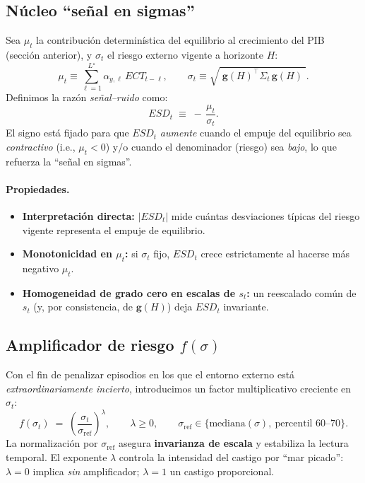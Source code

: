 \documentclass[11pt,a4paper]{article}
\newcommand{\1}{\mathbf{1}}
\newcommand{\vect}[1]{\boldsymbol{#1}}
\begin{document}
\subsection{Núcleo ``señal en sigmas''}

Sea $\mu_t$ la contribución determinística del equilibrio al crecimiento del PIB (sección anterior), y $\sigma_t$ el riesgo externo vigente a horizonte $H$:
\[
\mu_t \equiv \sum_{\ell=1}^{L^\star} \alpha_{y,\ell}\, ECT_{t-\ell},
\qquad
\sigma_t \equiv \sqrt{\;\vect{g}(H)^\top \Sigma_t\, \vect{g}(H)\;}.
\]
Definimos la razón \emph{señal--ruido} como:
\begin{equation}
\label{eq:esd}
ESD_t \;\equiv\; -\,\frac{\mu_t}{\sigma_t}.
\end{equation}
El signo está fijado para que $ESD_t$ \emph{aumente} cuando el empuje del equilibrio sea \emph{contractivo} (i.e., $\mu_t<0$) y/o cuando el denominador (riesgo) sea \emph{bajo}, lo que refuerza la ``señal en sigmas''.

\paragraph{Propiedades.}
\begin{itemize}
  \item \textbf{Interpretación directa:} $|ESD_t|$ mide cuántas desviaciones típicas del riesgo vigente representa el empuje de equilibrio. 
  \item \textbf{Monotonicidad en $\mu_t$:} si $\sigma_t$ fijo, $ESD_t$ crece estrictamente al hacerse más negativo $\mu_t$.
  \item \textbf{Homogeneidad de grado cero en escalas de $s_t$:} un reescalado común de $s_t$ (y, por consistencia, de \(\vect{g}(H)\)) deja $ESD_t$ invariante.
\end{itemize}

\subsection{Amplificador de riesgo \texorpdfstring{$f(\sigma)$}{f(sigma)}}

Con el fin de penalizar episodios en los que el entorno externo está \emph{extraordinariamente incierto}, introducimos un factor multiplicativo creciente en $\sigma_t$:
\begin{equation}
\label{eq:amp}
f(\sigma_t)
\;=\;
\left(\frac{\sigma_t}{\sigma_{\text{ref}}}\right)^{\lambda},
\qquad
\lambda \ge 0,
\qquad
\sigma_{\text{ref}} \in \{\text{mediana}(\sigma),\ \text{percentil 60--70}\}.
\end{equation}
La normalización por $\sigma_{\text{ref}}$ asegura \textbf{invarianza de escala} y estabiliza la lectura temporal. 
El exponente $\lambda$ controla la intensidad del castigo por ``mar picado'': $\lambda=0$ implica \emph{sin} amplificador; $\lambda=1$ un castigo proporcional.
\end{document}
